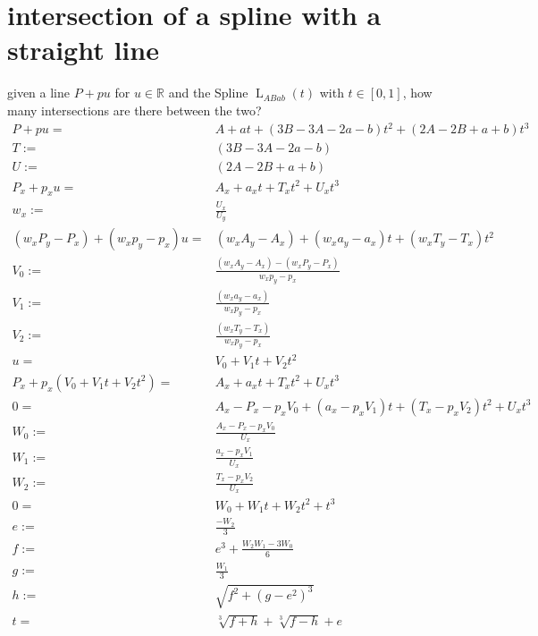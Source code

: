 \documentclass[10pt]{article}
\DeclareMathOperator{\Lspline}{L}
\begin{document}
\section{intersection of a spline with a straight line}
    given a line $P + pu$ for $u \in \mathbb{R}$ and the Spline $\Lspline_{ABab}(t)$ with $t \in [0, 1]$, how many intersections are there between the two?
    $$\begin{aligned}
        P + pu =& A + at + (3B - 3A - 2a - b)t^2 + (2A - 2B + a + b)t^3 \\
        T :=& (3B - 3A - 2a - b) \\
        U :=& (2A - 2B + a + b) \\
        P_x + p_xu =& A_x + a_xt + T_xt^2 + U_xt^3 \\
        w_x :=& \frac{U_x}{U_y} \\
        (w_xP_y - P_x) + (w_xp_y - p_x)u =& (w_xA_y - A_x) + (w_xa_y - a_x)t + (w_xT_y - T_x)t^2 \\
        V_0 :=& \frac{(w_xA_y - A_x) - (w_xP_y - P_x)}{w_xp_y - p_x} \\
        V_1 :=& \frac{(w_xa_y - a_x)}{w_xp_y - p_x} \\
        V_2 :=& \frac{(w_xT_y - T_x)}{w_xp_y - p_x} \\
        u =& V_0 + V_1t + V_2t^2 \\
        P_x + p_x\left(V_0 + V_1t + V_2t^2\right) =& A_x + a_xt + T_xt^2 + U_xt^3 \\
        0 =& A_x - P_x - p_xV_0 + (a_x - p_xV_1)t + (T_x - p_xV_2)t^2 + U_xt^3 \\
        W_0 :=& \frac{A_x - P_x - p_xV_0}{U_x} \\
        W_1 :=& \frac{a_x - p_xV_1}{U_x} \\
        W_2 :=& \frac{T_x - p_xV_2}{U_x} \\
        0 =& W_0 + W_1t + W_2t^2 + t^3 \\
        e :=& \frac{-W_2}{3} \\
        f :=& e^3 + \frac{W_2W_1-3W_0}{6} \\
        g :=& \frac{W_1}{3} \\
        h :=& \sqrt{f^2 + (g - e^2)^3} \\
        t =& \sqrt[3]{f + h} + \sqrt[3]{f - h} + e \\
    \end{aligned}$$
\end{document}
